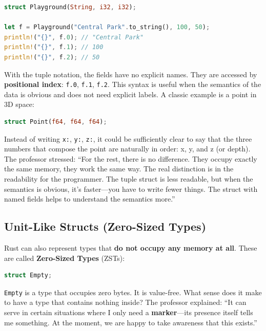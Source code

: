 \begin{lstlisting}[language=Rust]
struct Playground(String, i32, i32);

let f = Playground("Central Park".to_string(), 100, 50);
println!("{}", f.0); // "Central Park"
println!("{}", f.1); // 100
println!("{}", f.2); // 50
\end{lstlisting}

With the tuple notation, the fields have no explicit names. They are accessed by \textbf{positional index}: \texttt{f.0}, \texttt{f.1}, \texttt{f.2}. This syntax is useful when the semantics of the data is obvious and does not need explicit labels. A classic example is a point in 3D space:

\begin{lstlisting}[language=Rust]
struct Point(f64, f64, f64);
\end{lstlisting}

Instead of writing \texttt{x:}, \texttt{y:}, \texttt{z:}, it could be sufficiently clear to say that the three numbers that compose the point are naturally in order: x, y, and z (or depth). The professor stressed: ``For the rest, there is no difference. They occupy exactly the same memory, they work the same way. The real distinction is in the readability for the programmer. The tuple struct is less readable, but when the semantics is obvious, it's faster---you have to write fewer things. The struct with named fields helps to understand the semantics more.''

\subsection{Unit-Like Structs (Zero-Sized Types)}

Rust can also represent types that \textbf{do not occupy any memory at all}. These are called \textbf{Zero-Sized Types} (ZSTs):

\begin{lstlisting}[language=Rust]
struct Empty;
\end{lstlisting}

\texttt{Empty} is a type that occupies zero bytes. It is value-free. What sense does it make to have a type that contains nothing inside? The professor explained: ``It can serve in certain situations where I only need a \textbf{marker}---its presence itself tells me something. At the moment, we are happy to take awareness that this exists.''


